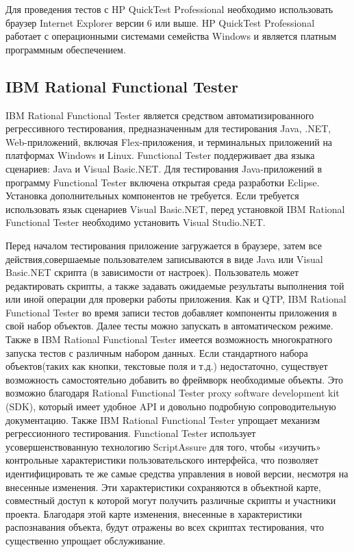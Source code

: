 Для проведения тестов с HP QuickTest Professional необходимо использовать
 браузер Internet Explorer версии 6 или выше. HP QuickTest Professional 
работает с операционными системами семейства Windows и является платным 
программным обеспечением.

\subsection*{IBM Rational Functional Tester}

IBM Rational Functional Tester является средством автоматизированного 
регрессивного тестирования, предназначенным для тестирования Java, .NET, 
Web-приложений, включая Flex-приложения, и терминальных приложений на 
платформах Windows и Linux. Functional Tester поддерживает два языка 
сценариев: Java и Visual Basic.NET. Для тестирования Java-приложений в 
программу Functional Tester включена открытая среда разработки Eclipse. 
Установка дополнительных компонентов не требуется. Если требуется 
использовать язык сценариев Visual Basic.NET, перед установкой IBM 
Rational Functional Tester необходимо установить Visual Studio.NET.

Перед началом тестирования приложение загружается в браузере, затем все 
действия,совершаемые пользователем записываются в виде Java или Visual 
Basic.NET скрипта (в зависимости от настроек). Пользователь может 
редактировать скрипты, а также задавать ожидаемые результаты выполнения 
той или иной операции для проверки работы приложения. Как и QTP, IBM 
Rational Functional Tester во время записи тестов добавляет компоненты 
приложения в свой набор объектов. Далее тесты можно запускать в 
автоматическом режиме. Также в IBM Rational Functional Tester имеется 
возможность многократного запуска тестов с различным набором данных. 
Если стандартного набора объектов(таких как кнопки, текстовые поля и т.д.) 
недостаточно, существует возможность самостоятельно добавить во фреймворк 
необходимые объекты. Это возможно благодаря Rational Functional Tester 
proxy software development kit (SDK), который имеет удобное API и 
довольно подробную сопроводительную документацию.
Также IBM Rational Functional Tester упрощает механизм регрессионного 
тестирования. Functional Tester использует усовершенствованную технологию 
ScriptAssure для того, чтобы «изучить» контрольные характеристики 
пользовательского интерфейса, что позволяет идентифицировать те же самые 
средства управления в новой версии, несмотря на внесенные изменения. 
Эти характеристики сохраняются в объектной карте, совместный доступ к 
которой могут получить различные скрипты и участники проекта. 
Благодаря этой карте изменения, внесенные в характеристики распознавания 
объекта, будут отражены во всех скриптах тестирования, что существенно 
упрощает обслуживание. 


